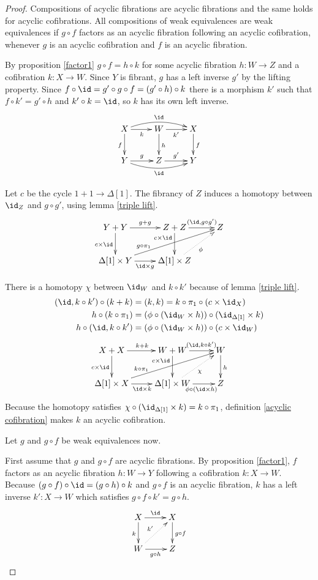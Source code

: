 \documentclass{tac}
\newcommand\of{:}
\newcommand\simplex\Delta
\begin{document}
\begin{proof}
Compositions of acyclic fibrations are acyclic fibrations and the same holds for acyclic cofibrations. All compositions of weak equivalences are weak equivalences if $g\circ f$ factors as an acyclic fibration following an acyclic cofibration, whenever $g$ is an acyclic cofibration and $f$ is an acyclic fibration.

By proposition \ref{factor1} $g\circ f=h\circ k$ for some acyclic fibration $h\of W\to Z$ and a cofibration $k\of X\to W$. Since $Y$ is fibrant, $g$ has a left inverse $g'$ by the lifting property. Since $f \circ \id = g'\circ g\circ f= (g'\circ h)\circ k$ there is a morphism $k'$ such that $f\circ k' = g'\circ h$ and $k'\circ k = \id$, so $k$ has its own left inverse.
\[\xymatrix{
X\ar[d]_f \ar[r]_{k} \ar@/^2ex/[rr]^{\id} & W\ar[d]^h \ar[r]_{k'} & X\ar[d]^f\\
Y \ar[r]^{g} \ar@/_2ex/[rr]_{\id} & Z \ar[r]^{g'} & Y
}\]

Let $c$ be the cycle $1+1\to\simplex[1]$. The fibrancy of $Z$ induces a homotopy between $\id_Z$ and $g\circ g'$, using lemma \ref{triple lift}.
\[\xymatrix{
Y+Y\ar[r]^{g+g}\ar[d]_{c\times\id} & Z+Z\ar[r]^(.6){(\id,g\circ g')}\ar[d]_(.3){c\times\id} & Z\\
\simplex[1]\times Y\ar[r]_{\id\times g}\ar[urr]^(.3){g\circ\pi_1} & \simplex[1]\times Z\ar@{.>}[ur]_{\phi}
}\]

There is a homotopy $\chi$ between $\id_W$ and $k\circ k'$ because of lemma \ref{triple lift}.
\begin{align*}
(\id, k\circ k')\circ (k+k) &= (k,k) = k\circ \pi_1\circ(c\times\id_X)\\
h\circ (k \circ \pi_1) &= (\phi\circ (\id_W\times h))\circ (\id_{\simplex[1]} \times k)\\
h\circ (\id, k\circ k') &= (\phi\circ (\id_W\times h))\circ (c\times \id_W)
\end{align*}
\[\xymatrix{
X+X\ar[d]_{c\times \id}\ar[r]^{k+k} & W+W\ar[d]_(.3){c\times \id}\ar[r]^(.6){(\id,k\circ k')} & W\ar[d]^h\\
\simplex[1]\times X\ar[r]_{\id\times k} \ar[urr]^(.3){k\circ \pi_1}  & \simplex[1]\times W\ar[r]_(.6){\phi\circ (\id\times h)} \ar@{.>}[ur]_\chi & Z
}\]
Because the homotopy satisfies $\chi\circ(\id_{\simplex[1]}\times k) = k\circ \pi_1$, definition \ref{acyclic cofibration} makes $k$ an acyclic cofibration.

Let $g$ and $g\circ f$ be weak equivalences now.

First assume that $g$ and $g\circ f$ are acyclic fibrations. By proposition \ref{factor1}, $f$ factors as an acyclic fibration $h\of W\to Y$ following a cofibration $k\of X\to W$. Because $(g\circ f)\circ \id = (g\circ h)\circ k$ and $g\circ f$ is an acyclic fibration, $k$ has a left inverse $k'\of X\to W$ which satisfies $g\circ f\circ k' = g\circ h$. 
\[\xymatrix{
X\ar[d]_k \ar[r]^\id & X\ar[d]^{g\circ f}\\
W\ar[r]_{g\circ h} \ar@{.>}[ur]^{k'} & Z
}\]


\end{proof}
\end{document}
